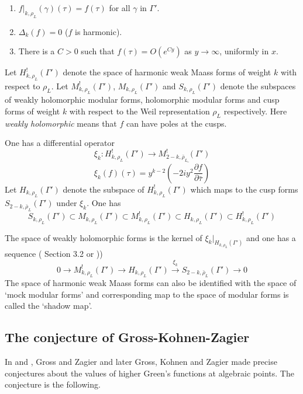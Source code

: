 \documentclass[11pt,a4paper]{article}
\begin{document}
\begin{enumerate} 
	\item  $f|_{k,\rho_L}(\gamma)(\tau)=f(\tau)$ for all $\gamma$ in $\Gamma'$. 
	\item  $\Delta_k(f)=0$ ($f$ is harmonic).
	\item  There is a $C > 0$ such that $f(\tau) = O(e^{Cy})$ as $y \rightarrow \infty$, uniformly in $x$. 
\end{enumerate}

Let $H^!_{k,\rho_L}(\Gamma')$ denote the space of harmonic weak Maass forms of weight $k$ with respect to $\rho_L$. Let $M^!_{k,\rho_L}(\Gamma')$, $M_{k,\rho_L}(\Gamma')$  and $S_{k,\rho_L}(\Gamma')$ denote the subspaces of weakly holomorphic modular forms,  holomorphic modular forms and cusp forms  of weight $k$ with respect to the Weil representation $\rho_L$  respectively. Here {\em weakly holomorphic} means that $f$ can have poles at the cusps. 

One has a differential operator 
$$\xi_k: H^!_{k,\rho_L}(\Gamma') \longrightarrow M^!_{2-k,\bar{\rho}_L}(\Gamma')$$
%
$$ \xi_k(f)(\tau)=y^{k-2} \overline {\left(-2i y^2\frac{\partial f}{\partial \bar{\tau}}\right)}$$
%
Let $H_{k,\rho_L}(\Gamma')$ denote the subspace of $H^!_{k,\rho_L}(\Gamma')$ which maps to the cusp forms $S_{2-k,\bar{\rho}_L}(\Gamma')$ under $\xi_k$. One has 
%
$$S_{k,\rho_L}(\Gamma') \subset M_{k,\rho_L}(\Gamma') \subset M^!_{k,\rho_L}(\Gamma') \subset H_{k,\rho_L}(\Gamma') \subset H^!_{k,\rho_L}(\Gamma') $$

The space of weakly  holomorphic forms is  the kernel of $\xi_k|_{H_{k,\rho_L}(\Gamma')}$ and one has a sequence (\cite{BEY} Section 3.2 or \cite{brfu}))
%
$$ 0 \longrightarrow M^!_{k,\rho_L}(\Gamma') \longrightarrow H_{k,\rho_L}(\Gamma') \stackrel{\xi_k}{\longrightarrow} S_{2-k,\bar{\rho}_{L}}(\Gamma') \longrightarrow 0$$
%
The space of harmonic weak Maass forms can also be identified with the space of `mock modular forms' and corresponding map to the space of modular forms is called the `shadow map'.






\fi

\subsection{The conjecture of Gross-Kohnen-Zagier}

In \cite{grza} and \cite{GKZ}, Gross and Zagier and later Gross, Kohnen and Zagier made precise conjectures about the values of higher Green's functions at algebraic points. The conjecture is the following.
\end{document}
